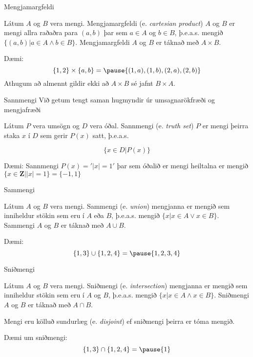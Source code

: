 \documentclass[handout]{beamer}
\begin{document}
\begin{frame}{Mengjamargfeldi}
\begin{tcolorbox}[title=Mengjamargfeldi]
Látum $A$ og $B$ vera mengi. Mengjamargfeldi (e. \emph{cartesian product}) $A$ og $B$ er mengi allra raðaðra para $(a, b)$ þar sem $a \in A$ og $b \in B$, þ.e.a.s. mengið $\{(a, b) | a \in A \land b \in B\}$. Mengjamargfeldi $A$ og $B$ er táknað með $A \times B$.
\end{tcolorbox}
Dæmi:
\[
 \{1, 2\} \times \{a, b\} = \pause \{(1, a), (1, b), (2, a), (2, b)\}
\]
Athugum að almennt gildir ekki að $A \times B$ sé jafnt $B \times A$.
\end{frame}

\begin{frame}{Sannmengi}
    Við getum tengt saman hugmyndir úr umsagnarökfræði og mengjafræði
    \begin{tcolorbox}[title=Sannmengi]
        Látum $P$ vera umsögn og $D$ vera óðal. Sannmengi (e. \emph{truth set}) $P$ er mengi þeirra staka $x$ í $D$ sem gerir $P(x)$ satt, þ.e.a.s.

        \[
            \{x \in D | P(x)\}
        \]
    \end{tcolorbox}

    Dæmi: Sannmengi $P(x) = '|x| = 1'$ þar sem óðalið er mengi heiltalna er mengið $\{x \in \mathbf{Z} | |x|=1\} = $\pause $\{-1,1\}$
\end{frame}

\begin{frame}{Sammengi}
\begin{tcolorbox}[title=Sammengi]
Látum $A$ og $B$ vera mengi. 
Sammengi (e. \emph{union}) mengjanna er mengið sem inniheldur stökin sem eru í $A$ eða $B$, 
þ.e.a.s. mengið $\{x | x \in A \lor x \in B \}$. 
Sammengi $A$ og $B$ er táknað með $A\cup B$.
\end{tcolorbox}
Dæmi:
\[
 \{1, 3\} \cup \{1, 2, 4\} = \pause \{1, 2, 3, 4\}
\]
\end{frame}

\begin{frame}{Sniðmengi}
\begin{tcolorbox}[title=Sniðmengi]
Látum $A$ og $B$ vera mengi.
Sniðmengi (e. \emph{intersection}) mengjanna er mengið sem inniheldur stökin sem eru í $A$ og $B$, 
þ.e.a.s. mengið $\{x | x \in A \land x \in B \}$. 
Sniðmengi $A$ og $B$ er táknað með $A\cap B$.
\end{tcolorbox}
Mengi eru kölluð sundurlæg (e. \emph{disjoint}) ef sniðmengi þeirra er tóma mengið.

Dæmi um sniðmengi:
\[
 \{1, 3\} \cap \{1, 2, 4\} = \pause \{1\}
\]
\end{frame}
\end{document}
